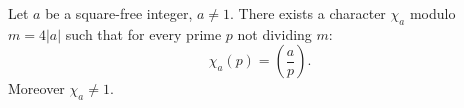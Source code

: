 Let $a$ be a square-free integer, $a \neq 1$. There exists a character $\chi_a$ modulo $m = 4|a|$ such that for every prime $p$ not dividing $m$:
$$
\chi_a(p) = \left(\frac{a}{p}\right).
$$
Moreover $\chi_a \neq 1$.
